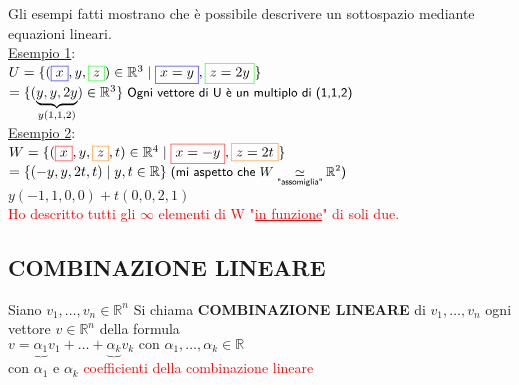 \textsf{\small Gli esempi fatti mostrano che è possibile descrivere un sottospazio mediante equazioni lineari. \nolinebreak}\\
\textsf{\underline{Esempio 1}:}\\
\(
U = \{ (\textcolor{blue}{\boxed{\normalcolor x}},y,\color{green}\boxed{\normalcolor z}\normalcolor) \in \mathbb{R}^3 \mid \color{blue}\boxed{\normalcolor x = y}\normalcolor, \color{green}\boxed{\normalcolor z = 2y}\normalcolor \}
\)\\
\(
= \{ (\underbrace{y, y, 2y} _{y(1,1,2)}) \in \mathbb{R}^3\} \hspace{.1cm}\textsf{\small Ogni vettore di U è un multiplo di (1,1,2)}
\)\\
\enlargethispage{1\linewidth}
\textsf{\underline{Esempio 2}:}\label{esempio2} \\
\(
W = \{ (\textcolor{red}{\boxed{\normalcolor x}},y,\textcolor{orange}{\boxed{\normalcolor z}},t) \in \mathbb{R}^4 \mid \textcolor{red}{\boxed{\normalcolor x = -y}}, \textcolor{orange}{\boxed{\normalcolor z = 2t}}\}
\)\\
\(
= \{ (-y,y,2t,t) \mid y,t \in \mathbb{R}\} \hspace{.1cm} \textsf{\small (mi aspetto che $W \underset{\text{"assomiglia"}}{\simeq} \mathbb{R}^2$)}
\)\\
\(
y(-1,1,0,0) + t(0,0,2,1) 
\)\\
\textsf{\small \textcolor{red}{Ho descritto tutti gli $\infty$ elementi di W "\underline{in funzione}" di soli due.}}


\newpage

\subsection{COMBINAZIONE LINEARE}

\begin{definition}
	Siano $v_1, \dots , v_n \in \mathbb{R}^n$ Si chiama \textbf{COMBINAZIONE LINEARE} di $v_1, \dots , v_n$ ogni vettore $v \in \mathbb{R}^n$ della formula \\
	\centering $ v = \underbrace{\alpha_1} v_1 + \dots + \underbrace{\alpha_k} v_k \text{ con } \alpha_1, \dots , \alpha_k \in \mathbb{R}$ \\
	con $\alpha_1$ e $\alpha_k$ \textcolor{red}{coefficienti della combinazione lineare}
\end{definition}

